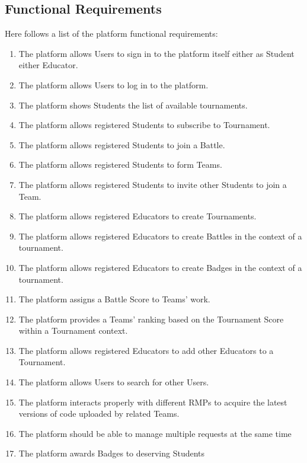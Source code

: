 \subsection{Functional Requirements}
Here follows a list of the platform functional requirements:
\begin{enumerate}[label= \textbf{R\arabic*}]
    \item The platform allows Users to sign in to the platform itself either as Student either Educator. \label{req:reqSignin}
    \item The platform allows Users to log in to the platform. \label{req:reqLogin}
    \item The platform shows Students the list of available tournaments. \label{req:reqShowTournaments}
    \item The platform allows registered Students to subscribe to Tournament. \label{req:reqTournamentSubscription}
    \item The platform allows registered Students to join a Battle. \label{req:reqJoinBattle}
    \item The platform allows registered Students to form Teams. \label{req:reqCreateTeam}
    \item The platform allows registered Students to invite other Students to join a Team. \label{req:reqJoinTeam}
    \item The platform allows registered Educators to create Tournaments. \label{req:reqCreateTournaments}
    \item The platform allows registered Educators to create Battles in the context of a tournament. \label{req:reqCreateBattle}
    \item The platform allows registered Educators to create Badges in the context of a tournament. \label{req:reqCreateBadge}
    \item The platform assigns a Battle Score to Teams' work. \label{req:reqEvaluateCode}
    \item The platform provides a Teams' ranking based on the Tournament Score within a Tournament context. \label{req:reqRankingsUpdate}
    \item The platform allows registered Educators to add other Educators to a Tournament. \label{req:reqJoinManagement}
    \item The platform allows Users to search for other Users. \label{req:req11}
    \item The platform interacts properly with different RMPs to acquire the latest versions of code uploaded by related Teams. \label{req:req12}
    \item The platform should be able to manage multiple requests at the same time \label{req:req13}
    \item The platform awards Badges to deserving Students \label{req:reqAssignBadge}
\end{enumerate}

